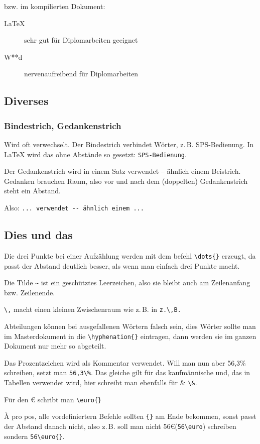 	bzw. im kompilierten Dokument:
	\begin{description}
	    \item [LaTeX] sehr gut für Diplomarbeiten geeignet
	    \item [W**d]  nervenaufreibend für Diplomarbeiten
	\end{description}		
		
		
	\subsection{Diverses}
		\subsubsection{Bindestrich, Gedankenstrich}
			Wird oft verwechselt. 
			Der Bindestrich verbindet Wörter, z.\,B. SPS-Bedienung. In \LaTeX{} wird das ohne Abstände so gesetzt:
			\verb"SPS-Bedienung".
			
			Der Gedankenstrich wird in einem Satz verwendet -- ähnlich einem Beistrich. Gedanken brauchen Raum, also vor und nach dem (doppelten) Gedankenstrich steht ein Abstand.
			
			Also: \verb"... verwendet -- ähnlich einem ..."
			
		\subsection{Dies und das}
			Die drei Punkte bei einer Aufzählung werden mit dem befehl \verb"\dots{}" erzeugt, da passt der Abstand deutlich besser, als wenn man einfach drei Punkte macht.
			
			\label{kap:tilde}
			Die Tilde \verb"~" ist ein geschütztes Leerzeichen, also sie bleibt auch am Zeilenanfang bzw. Zeilenende.
			
			\verb"\," macht einen kleinen Zwischenraum wie z.\,B. in \verb"z.\,B."
			
			Abteilungen können bei ausgefallenen Wörtern falsch sein, dies Wörter sollte man im Masterdokument in die
			\verb"\hyphenation{}" eintragen, dann werden sie im ganzen Dokument nur mehr so abgeteilt.
			
			Das Prozentzeichen wird als Kommentar verwendet. Will man nun aber 56,3\% schreiben, setzt man \verb"56,3\%". Das gleiche gilt für das kaufmännische und, das in Tabellen verwendet wird, hier schreibt man ebenfalls für \& \verb"\&".
			
			Für den \euro{} schribt man \verb"\euro{}"
			
			\`{A} pro pos, alle vordefiniertern Befehle sollten \verb"{}" am Ende bekommen, sonst passt der Abstand danach nicht, also z.\,B. soll man nicht 56\euro (\verb"56\euro") schreiben sondern \verb"56\euro{}".
			
